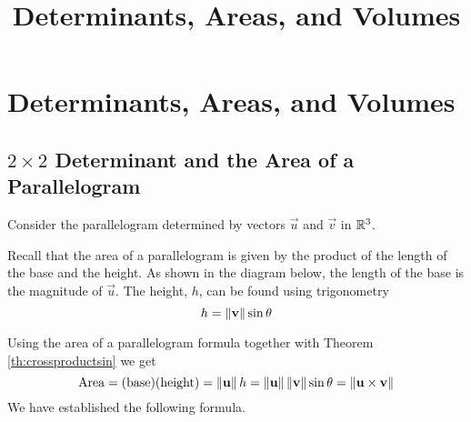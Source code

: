 \documentclass{ximera}
\title{Determinants, Areas, and Volumes} \license{CC BY-NC-SA 4.0}
\begin{document}
\begin{abstract}
 \end{abstract}
\maketitle

\section*{Determinants, Areas, and Volumes}

\subsection*{$2\times 2$ Determinant and the Area of a Parallelogram}

Consider the parallelogram determined by vectors $\vec{u}$ and $\vec{v}$ in $\mathbb{R}^3$.

\begin{center}
\end{center}

Recall that the area of a parallelogram is given by the product of the length of the base and the height.
As shown in the diagram below, the length of the base is the magnitude of $\vec{u}$. The height, $h$, can be found using trigonometry $$h=\left\lVert\mathbf{v}\right\rVert\sin\theta$$ 
\begin{center}
\end{center}
Using the area of a parallelogram formula together with Theorem \ref{th:crossproductsin} we get
$$\mbox{Area}=(\text{base})(\text{height})=\left\lVert\mathbf{u}\right\rVert h=\left\lVert\mathbf{u}\right\rVert\left\lVert\mathbf{v}\right\rVert\sin\theta=\left\lVert\mathbf{u}\times\mathbf{v}\right\rVert$$
We have established the following formula.
\end{document}
